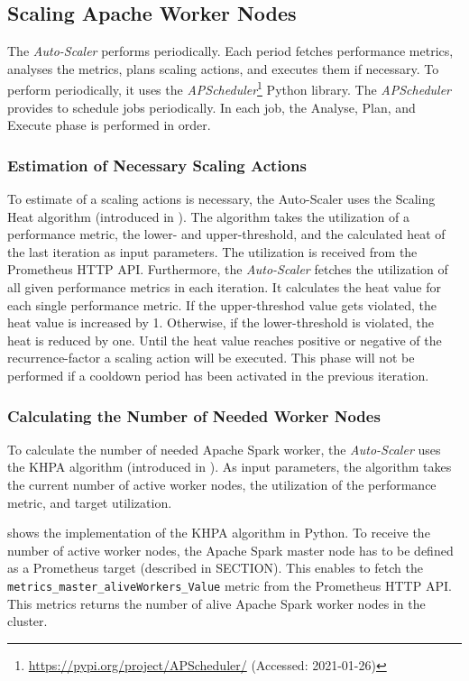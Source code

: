\subsection{Scaling Apache Worker Nodes}
The \textit{Auto-Scaler} performs periodically. Each period fetches performance metrics, analyses the metrics, plans scaling actions, and executes them if necessary.
To perform periodically, it uses the \textit{APScheduler}\footnote{\url{https://pypi.org/project/APScheduler/} (Accessed: 2021-01-26)} Python library. The \textit{APScheduler} provides to schedule jobs periodically.
In each job, the Analyse, Plan, and Execute phase is performed in order.


\subsubsection{Estimation of Necessary Scaling Actions}
To estimate of a scaling actions is necessary, the Auto-Scaler uses the Scaling Heat algorithm (introduced in ).
The algorithm takes the utilization of a performance metric, the lower- and upper-threshold, and the calculated heat of the last iteration as input parameters.
The utilization is received from the Prometheus HTTP API. Furthermore, the \textit{Auto-Scaler} fetches the utilization of all given performance metrics in each iteration. It calculates the heat value for each single performance metric. If the upper-threshod value gets violated, the heat value is increased by 1. Otherwise, if the lower-threshold is violated, the heat is reduced by one.
Until the heat value reaches positive or negative of the recurrence-factor a scaling action will be executed.
This phase will not be performed if a cooldown period has been activated in the previous iteration.


\subsubsection{Calculating the Number of Needed Worker Nodes}
To calculate the number of needed Apache Spark worker, the \textit{Auto-Scaler} uses the KHPA algorithm (introduced in ).
As input parameters, the algorithm takes the current number of active worker nodes, the utilization of the performance metric, and target utilization.


 shows the implementation of the KHPA algorithm in Python.
To receive the number of active worker nodes, the Apache Spark master node has to be defined as a Prometheus target (described in SECTION). This enables to fetch the \texttt{metrics\_master\_aliveWorkers\_Value} metric from the Prometheus HTTP API. This metrics returns the number of alive Apache Spark worker nodes in the cluster.

